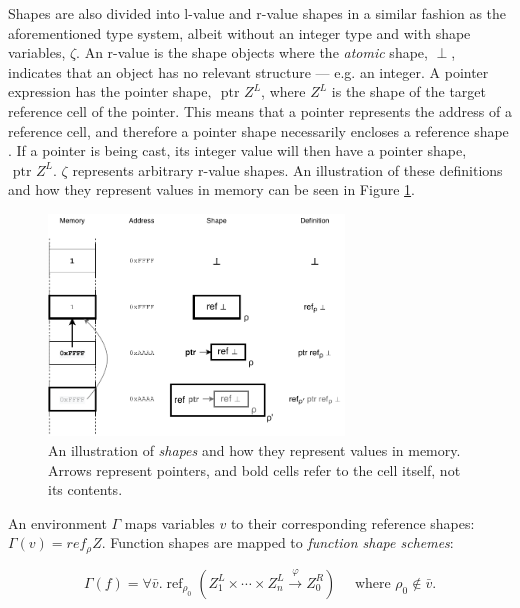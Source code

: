 Shapes are also divided into l-value and r-value shapes in a similar fashion as the aforementioned type system, albeit without an integer type and with shape variables, $\zeta$. An r-value is the shape objects where the \textit{atomic} shape, $\perp$, indicates that an object has no relevant structure --- e.g. an integer. A pointer expression has the pointer shape, $\text{ ptr } Z^L$, where $Z^L$ is the shape of the target reference cell of the pointer. This means that a pointer represents the address of a reference cell, and therefore a pointer shape necessarily encloses a reference shape . If a pointer is being cast, its integer value will then have a pointer shape, $\text{ ptr } Z^L$. $\zeta$ represents arbitrary r-value shapes. An illustration of these definitions and how they represent values in memory can be seen in Figure \ref{shapes-figure}.

\begin{figure}[H]
    \centering
    \includegraphics[width=0.7\textwidth]{background/figures/shapes}
    \caption{An illustration of \textit{shapes} and how they represent values in memory. Arrows represent pointers, and bold cells refer to the cell itself, not its contents.}
    \label{shapes-figure}
\end{figure}

\noindent An environment $\Gamma$ maps variables $v$ to their corresponding reference shapes: $\Gamma(v) = ref_\rho Z$. Function shapes are mapped to \textit{function shape schemes}:  

\begin{equation*}
    \Gamma(f)=\forall \bar{v} . \operatorname{ref}_{\rho_{0}}\left(Z_{1}^{L} \times \cdots \times Z_{n}^{L} \stackrel{\varphi}{\rightarrow} Z_{0}^{R}\right) \quad \text { where } \rho_{0} \notin \bar{v}. 
\end{equation*}


